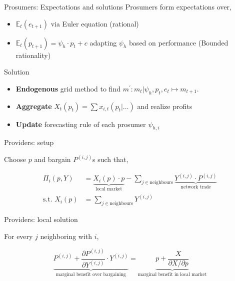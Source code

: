 \documentclass[xcolor={svgnames}]{beamer}
\newcommand{\E}{\mathbb{E}}
\begin{document}
    \begin{frame}{Prosumers: Expectations and solutions}
        Prosumers form expectations over,

        \begin{itemize} \setlength{\itemsep}{1em}
            \item $\E_t(e_{t+1})$ via Euler equation (rational)
            \item $\E_t(p_{t+1}) = \psi_h \cdot p_t + c$ adapting $\psi_h$ based on performance (Bounded rationality)
        \end{itemize}

        Solution

        \begin{itemize} \setlength{\itemsep}{1em}
            \item \textbf{Endogenous} grid method to find $m^\prime: m_t \vert \psi_h, p_t, e_t \mapsto m_{t+1}$.
            \item \textbf{Aggregate} $X_t(p_t) = \sum x_{i, t}(p_t \vert \ldots)$ and realize profits
            \item \textbf{Update} forecasting rule of each prosumer $\psi_{h, i}$
        \end{itemize}
    \end{frame}

    \begin{frame}{Providers: setup}

        Choose $p$ and bargain $P^{(i, j)}$s such that,

        \begin{equation*}
            \begin{split}
                \Pi_i\left(p, Y\right) &= \underbrace{X_i(p) \cdot p}_{\text{local market}} - \sum_{j \in \text{neighbours}} \underbrace{Y^{(i, j)} \cdot P^{(i, j)}}_{\text{network trade}} \\
                \text{s.t. } X_i(p) &=\sum_{j \in \text{neighbours}} Y^{(i, j)}
            \end{split}
        \end{equation*}
    \end{frame}


    \begin{frame}{Providers: local solution}

        For every $j$ neighboring with $i$,

        \begin{equation*}
            \underbrace{P^{(i, j)}+ \frac{\partial P^{(i, j)}}{\partial Y^{(i, j)}} \cdot Y^{(i, j)}}_{\text{marginal benefit over bargaining}} = \underbrace{p + \frac{X}{\partial X / \partial p} }_{\text{marginal benefit in local market}}
        \end{equation*}

    \end{frame}
\end{document}
